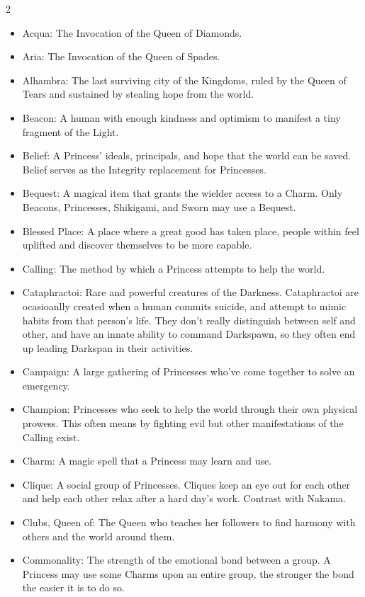 \begin{multicols}{2}
\begin{itemize}
  \item Acqua: The Invocation of the Queen of Diamonds.
  \item Aria: The Invocation of the Queen of Spades.
  \item Alhambra: The last surviving city of the Kingdoms, ruled by the Queen of Tears and sustained by stealing hope from the world. 
  \item Beacon: A human with enough kindness and optimism to manifest a tiny fragment of the Light.
  \item Belief: A Princess' ideals, principals, and hope that the world can be saved. Belief serves as the Integrity replacement for Princesses. 
  \item Bequest: A magical item that grants the wielder access to a Charm. Only Beacons, Princesses, Shikigami, and Sworn may use a Bequest. 
  \item Blessed Place: A place where a great good has taken place, people within feel uplifted and discover themselves to be more capable. 
  \item Calling: The method by which a Princess attempts to help the world. 
  \item Cataphractoi: Rare and powerful creatures of the Darkness. Cataphractoi are ocasioanlly created when a human commits suicide, and attempt to mimic habits from that person's life. They don't really distinguish between self and other, and have an innate ability to command Darkspawn, so they often end up leading Darkspan in their activities. 
  \item Campaign: A large gathering of Princesses who've come together to solve an emergency. 
  \item Champion: Princesses who seek to help the world through their own physical prowess. This often means by fighting evil but other manifestations of the Calling exist. 
  \item Charm: A magic spell that a Princess may learn and use. 
  \item Clique: A social group of Princesses. Cliques keep an eye out for each other and help each other relax after a hard day's work. Contrast with Nakama.
  \item Clubs, Queen of: The Queen who teaches her followers to find harmony with others and the world around them.
  \item Commonality: The strength of the emotional bond between a group. A Princess may use some Charms upon an entire group, the stronger the bond the easier it is to do so. 

\end{itemize}
\end{multicols}

